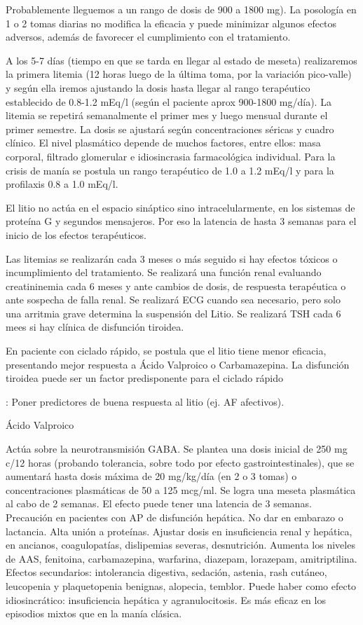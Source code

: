 \documentclass{scrbook}
\begin{document}
Probablemente lleguemos a un rango de dosis de 900 a 1800 mg). La posología en 1 o 2 tomas diarias no modifica la eficacia y puede minimizar algunos efectos adversos, además de favorecer el cumplimiento con el tratamiento.

A los 5-7 días (tiempo en que se tarda en llegar al estado de meseta) realizaremos la primera litemia (12 horas luego de la última toma, por la variación pico-valle) y según ella iremos ajustando la dosis hasta llegar al rango terapéutico establecido de 0.8-1.2 mEq/l (según el paciente aprox 900-1800 mg/día). La litemia se repetirá semanalmente el primer mes y luego mensual durante el primer semestre. La dosis se ajustará según concentraciones séricas y cuadro clínico. El nivel plasmático depende de muchos factores, entre ellos: masa corporal, filtrado glomerular e idiosincrasia farmacológica individual. Para la crisis de manía se postula un rango terapéutico de 1.0 a 1.2 mEq/l y para la profilaxis 0.8 a 1.0 mEq/l.

El litio no actúa en el espacio sináptico sino intracelularmente, en los sistemas de proteína G y segundos mensajeros. Por eso la latencia de hasta 3 semanas para el inicio de los efectos terapéuticos.

Las litemias se realizarán cada 3 meses o más seguido si hay efectos tóxicos o incumplimiento del tratamiento. Se realizará una función renal evaluando creatininemia cada 6 meses y ante cambios de dosis, de respuesta terapéutica o ante sospecha de falla renal. Se realizará ECG cuando sea necesario, pero solo una arritmia grave determina la suspensión del Litio. Se realizará TSH cada 6 mees si hay clínica de disfunción tiroidea.

En paciente con ciclado rápido, se postula que el litio tiene menor eficacia, presentando mejor respuesta a Ácido Valproico o Carbamazepina. La disfunción tiroidea puede ser un factor predisponente para el ciclado rápido


\faTasks: Poner predictores de buena respuesta al litio (ej. AF afectivos).

\faPills Ácido Valproico

Actúa sobre la neurotransmisión GABA. Se plantea una dosis inicial de 250 mg c/12 horas (probando tolerancia, sobre todo por efecto gastrointestinales), que se aumentará hasta dosis máxima de 20 mg/kg/día (en 2 o 3 tomas) o concentraciones plasmáticas de 50 a 125 mcg/ml. Se logra una meseta plasmática al cabo de 2 semanas. El efecto puede tener una latencia de 3 semanas. Precaución en pacientes con AP de disfunción hepática. No dar en embarazo o lactancia. Alta unión a proteínas. Ajustar dosis en insuficiencia renal y hepática, en ancianos, coagulopatías, dislipemias severas, desnutrición. Aumenta los niveles de AAS, fenitoina, carbamazepina, warfarina, diazepam, lorazepam, amitriptilina. Efectos secundarios: intolerancia digestiva, sedación, astenia, rash cutáneo, leucopenia y plaquetopenia benignas, alopecia, temblor. Puede haber como efecto idiosincrático: insuficiencia hepática y agranulocitosis.
Es más eficaz en los episodios mixtos que en la manía clásica.
\end{document}
